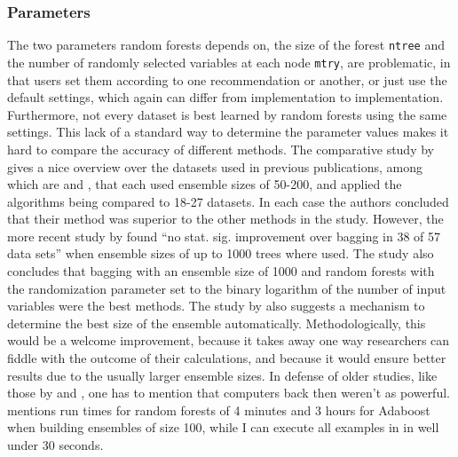 \documentclass[a4paper,man,12pt,apacite,floatsintext,draftfirst]{apa6} %
\begin{document}
\subsubsection{Parameters}
The two parameters random forests depends on, the size of the forest
\texttt{ntree} and the number of randomly selected variables at each node
\texttt{mtry}, are problematic,
in that users set them according to one recommendation or another,
or just use the default settings, which again can differ from implementation
to implementation.
Furthermore, not every dataset is best learned by random forests using the
same settings.
This lack of a standard way to determine the parameter values makes it hard
to compare the accuracy of different methods.
The comparative study by \cite{banfield2007comparison} gives a nice overview
over the datasets used in previous publications,
among which are \cite{breiman2001random} and \cite{dietterich2000ensemble},
that each used ensemble sizes of 50-200, and applied the algorithms being
compared to 18-27 datasets.
In each case the authors concluded that their method was superior to the
other methods in the study.
However, the more recent study by \cite{banfield2007comparison} found
“no stat. sig. improvement over bagging in 38 of 57 data sets”
when ensemble sizes of up to 1000 trees where used.
The study also concludes that bagging with an ensemble size of 1000 and
random forests with the randomization parameter set to the
binary logarithm of the number of input variables were the best methods.
The study by \cite{banfield2007comparison} also suggests a mechanism
to determine the best size of the ensemble automatically.
Methodologically, this would be a welcome improvement, because it takes
away one way researchers can fiddle with the outcome of their calculations,
and because it would ensure better results due to the usually larger
ensemble sizes.
In defense of older studies, like those by \cite{breiman2001random} and
\cite{dietterich2000ensemble}, one has to mention that
computers back then weren't as powerful.
\cite{breiman2001random} mentions run times for random forests of 4 minutes
and 3 hours for Adaboost when building ensembles of size 100,
while I can execute all examples in \cite{strobl2009introduction}
in well under 30 seconds.
\end{document}
